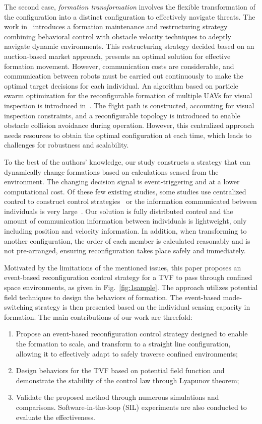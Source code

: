 The second case, \textit{formation transformation} involves the flexible transformation of the configuration into a distinct configuration to effectively navigate threats. The work in~\cite{Fu2020} introduces a formation maintenance and restructuring strategy combining behavioral control with obstacle velocity techniques to adeptly navigate dynamic environments. This restructuring strategy decided based on an auction-based market approach, presents an optimal solution for effective formation movement. However, communication costs are considerable, and communication between robots must be carried out continuously to make the optimal target decisions for each individual. An algorithm based on particle swarm optimization for the reconfigurable formation of multiple UAVs for visual inspection is introduced in~\cite{8843165}. The flight path is constructed, accounting for visual inspection constraints, and a reconfigurable topology is introduced to enable obstacle collision avoidance during operation. However, this centralized approach needs resources to obtain the optimal configuration at each time, which leads to challenges for robustness and scalability.

To the best of the authors' knowledge, our study constructs a strategy that can dynamically change formations based on calculations sensed from the environment. The changing decision signal is event-triggering and at a lower computational cost. Of these few existing studies, some studies use centralized control to construct control strategies~\cite{Gmez2013,Roy2018,AlonsoMora2017,8843165} or the information communicated between individuals is very large~\cite{Saska2020,Fu2020}. Our solution is fully distributed control and the amount of communication information between individuals is lightweight, only including position and velocity information. In addition, when transforming to another configuration, the order of each member is calculated reasonably and is not pre-arranged, ensuring reconfiguration takes place safely and immediately.

Motivated by the limitations of the mentioned issues, this paper proposes an event-based reconfiguration control strategy for a TVF to pass through confined space environments, as given in Fig.~\ref{fig:1sample}. The approach utilizes potential field techniques to design the behaviors of formation. The event-based mode-switching strategy is then presented based on the individual sensing capacity in formation. The main contributions of our work are threefold:
\begin{enumerate}
    \item Propose an event-based reconfiguration control strategy designed to enable the formation to scale, and transform to a straight line configuration, allowing it to effectively adapt to safely traverse confined environments;
        \item Design behaviors for the TVF based on potential field function and demonstrate the stability of the control law through Lyapunov theorem;
    \item Validate the proposed method through numerous simulations and comparisons. Software-in-the-loop (SIL) experiments are also conducted to evaluate the effectiveness.
\end{enumerate}

